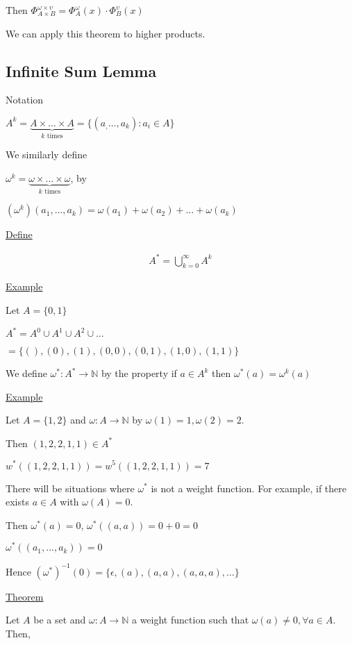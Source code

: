 \documentclass{article}
\begin{document}
Then $\Phi_{A \times B}^{\omega \times \upsilon} = \Phi_{A}^{\omega}(x) \cdot \Phi_{B}^{\upsilon}(x)$

We can apply this theorem to higher products.

\subsection{Infinite Sum Lemma}

Notation

$A^k = \underbrace{A \times \ldots \times A}_{k \text{ times}} = \{(a_,\ldots,a_k):a_i \in A\}$

We similarly define

$\omega^k = \underbrace{\omega \times \ldots \times \omega}_{k \text{ times}}$, by

$(\omega^k)(a_1, \ldots, a_k) = \omega(a_1) + \omega(a_2) + \ldots + \omega(a_k)$

\underline{Define}

\begin{align*}
A^* = \bigcup_{k=0}^{\infty}A^k
\end{align*}

\underline{Example}

Let $A = \{0,1\}$

$A^* = A^0 \cup A^1 \cup A^2 \cup \ldots$

$ = \{(),(0),(1),(0,0),(0,1),(1,0),(1,1)\}$

We define $\omega^{*} : A^{*} \to \mathbb{N}$ by the property if $a \in A^{k}$ then $\omega^{*}(a) = \omega^{k}(a)$

\underline{Example}

Let $A = \{1,2\}$ and $\omega: A \to \mathbb{N}$ by $\omega(1) = 1, \omega(2) = 2$.

Then $(1,2,2,1,1) \in A^*$

$w^*((1,2,2,1,1)) = w^5((1,2,2,1,1)) = 7$

There will be situations where $\omega^*$ is not a weight function. For example, if there exists $a \in A$ with $\omega(A) = 0$.

Then $\omega^*(a)=0$, $\omega^*((a,a)) = 0+0=0$

$\omega^*((a_1,\ldots,a_k)) = 0$

Hence $(\omega^*)^{-1}(0) = \{\epsilon, (a),(a,a),(a,a,a),\ldots\}$

\underline{Theorem}

Let $A$ be a set and $\omega: A \to \mathbb{N}$ a weight function such that $\omega(a) \ne 0, \forall a \in A$. Then,
\end{document}
